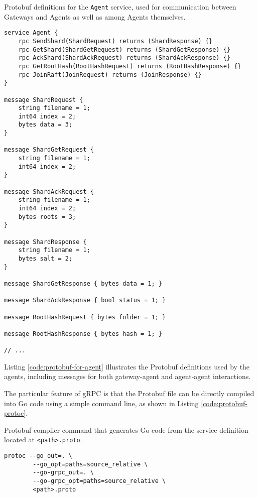 \begin{listing}[H]
\caption{Protobuf definitions for the \texttt{Agent} service, used for communication between Gateways and Agents as well as among Agents themselves.}
\label{code:protobuf-for-agent}
\begin{verbatim}
service Agent {
    rpc SendShard(ShardRequest) returns (ShardResponse) {}
    rpc GetShard(ShardGetRequest) returns (ShardGetResponse) {}
    rpc AckShard(ShardAckRequest) returns (ShardAckResponse) {}
    rpc GetRootHash(RootHashRequest) returns (RootHashResponse) {}
    rpc JoinRaft(JoinRequest) returns (JoinResponse) {}
}

message ShardRequest {
    string filename = 1;
    int64 index = 2;
    bytes data = 3;
}

message ShardGetRequest {
    string filename = 1;
    int64 index = 2;
}

message ShardAckRequest {
    string filename = 1;
    int64 index = 2;
    bytes roots = 3;
}

message ShardResponse {
    string filename = 1;
    bytes salt = 2;
}

message ShardGetResponse { bytes data = 1; }

message ShardAckResponse { bool status = 1; }

message RootHashRequest { bytes folder = 1; }

message RootHashResponse { bytes hash = 1; }

// ...
\end{verbatim}
\end{listing}

Listing \ref{code:protobuf-for-agent} illustrates the Protobuf definitions used by the agents, including messages for both gateway-agent and agent-agent interactions.

The particular feature of gRPC is that the Protobuf file can be directly compiled into Go code using a simple command line, as shown in Listing \ref{code:protobuf-protoc}.

\begin{listing}
\caption{Protobuf compiler command that generates Go code from the service definition located at \texttt{<path>.proto}.}
\label{code:protobuf-protoc}
\begin{verbatim}
protoc --go_out=. \
        --go_opt=paths=source_relative \
        --go-grpc_out=. \
        --go-grpc_opt=paths=source_relative \
        <path>.proto
\end{verbatim}
\end{listing}

